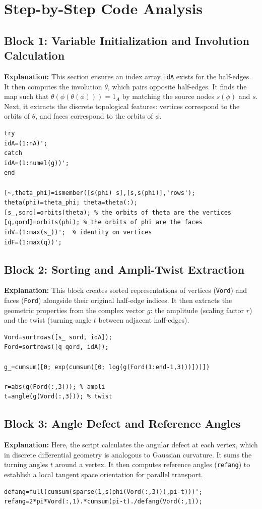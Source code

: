 \section*{Step-by-Step Code Analysis}

\subsection*{Block 1: Variable Initialization and Involution Calculation}
\textbf{Explanation:} This section ensures an index array \texttt{idA} exists for the half-edges. It then computes the involution $\theta$, which pairs opposite half-edges. It finds the map such that $\theta(\phi(\theta(\phi))) = 1_A$ by matching the source nodes $s(\phi)$ and $s$. Next, it extracts the discrete topological features: vertices correspond to the orbits of $\theta$, and faces correspond to the orbits of $\phi$.
\begin{lstlisting}
try
idA=(1:nA)';
catch
idA=(1:numel(g))';
end

[~,theta_phi]=ismember([s(phi) s],[s,s(phi)],'rows');
theta(phi)=theta_phi; theta=theta(:);
[s_,sord]=orbits(theta); % the orbits of theta are the vertices
[q,qord]=orbits(phi); % the orbits of phi are the faces
idV=(1:max(s_))';  % identity on vertices
idF=(1:max(q))';
\end{lstlisting}

\subsection*{Block 2: Sorting and Ampli-Twist Extraction}
\textbf{Explanation:} This block creates sorted representations of vertices (\texttt{Vord}) and faces (\texttt{Ford}) alongside their original half-edge indices. It then extracts the geometric properties from the complex vector $g$: the amplitude (scaling factor $r$) and the twist (turning angle $t$ between adjacent half-edges). 
\begin{lstlisting}
Vord=sortrows([s_ sord, idA]);
Ford=sortrows([q qord, idA]);

g_=cumsum([0; exp(cumsum([0; log(g(Ford(1:end-1,3)))]))])

r=abs(g(Ford(:,3))); % ampli
t=angle(g(Vord(:,3))); % twist
\end{lstlisting}

\subsection*{Block 3: Angle Defect and Reference Angles}
\textbf{Explanation:} Here, the script calculates the angular defect at each vertex, which in discrete differential geometry is analogous to Gaussian curvature. It sums the turning angles $t$ around a vertex. It then computes reference angles (\texttt{refang}) to establish a local tangent space orientation for parallel transport.
\begin{lstlisting}
defang=full(cumsum(sparse(1,s(phi(Vord(:,3))),pi-t)))';
refang=2*pi*Vord(:,1).*cumsum(pi-t)./defang(Vord(:,1));
\end{lstlisting}


